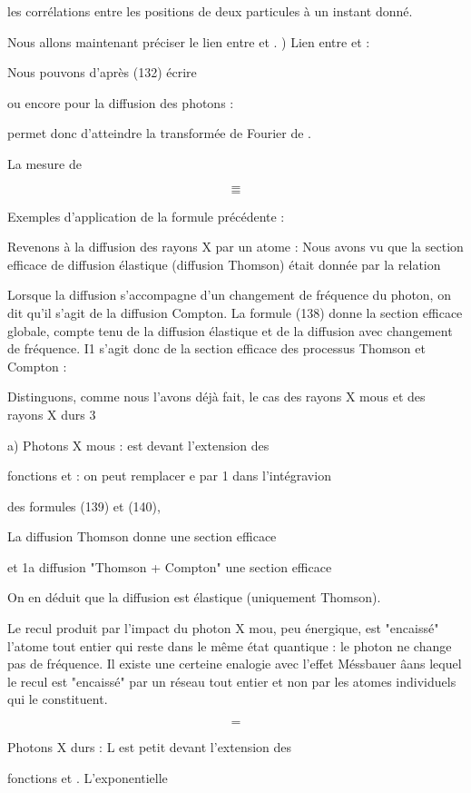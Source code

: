 les corrélations entre les positions de deux particules à un instant donné.

Nous allons maintenant préciser le lien entre et .
) Lien entre  et  :

Nous pouvons d'après (132) écrire

ou encore pour la diffusion des photons :

permet donc d'atteindre la transformée de Fourier de .

La mesure de


\[
\tag{139}=
\]
\[
\tag{140}=
\]

Exemples d'application de la formule précédente :

Revenons à la diffusion des rayons X par un atome :
Nous avons vu que la section efficace de diffusion élastique
(diffusion Thomson) était donnée par la relation

Lorsque la diffusion s'accompagne d'un changement de fréquence du photon,
on dit qu'il s'agit de la diffusion Compton. La formule (138) donne la
section efficace globale, compte tenu de la diffusion élastique et de la
diffusion avec changement de fréquence. I1 s'agit donc de la section efficace des
processus Thomson et Compton :

Distinguons, comme nous l'avons déjà fait, le cas des rayons X mous et des
rayons X durs 3

a) Photons X mous :  est  devant l'extension des

fonctions  et  : on peut remplacer e par 1 dans l'intégravion

des formules (139) et (140),

La diffusion Thomson donne une section efficace

et 1a diffusion "Thomson + Compton" une section efficace 

On en déduit que la diffusion est élastique (uniquement Thomson).

Le recul produit par l'impact du photon X mou, peu énergique, est "encaissé"
l'atome tout entier qui reste dans le même état quantique : le photon ne change
pas de fréquence. Il existe une certeine enalogie avec l'effet Méssbauer âans
lequel le recul est "encaissé" par un réseau tout entier et non par les atomes
individuels qui le constituent.

\[
\tag{141}=
\]

 Photons X durs : L est petit devant l'extension des

fonctions  et . L'exponentielle 

